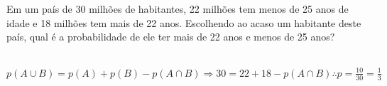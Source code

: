 \begin{ex}
Em um país de 30 milhões de habitantes, 22 milhões tem menos de 25 anos de idade e 18 milhões tem mais de 22 anos. Escolhendo ao acaso um habitante deste país, qual é a probabilidade de ele ter mais de 22 anos e menos de 25 anos?
 \begin{sol}
  \phantom{A} \\
  $p(A\cup B)=p(A)+p(B)-p(A \cap B)\Longrightarrow 30=22+18-p(A \cap B) \therefore p=\frac{10}{30}=\frac{1}{3}$
 \end{sol}
\end{ex}